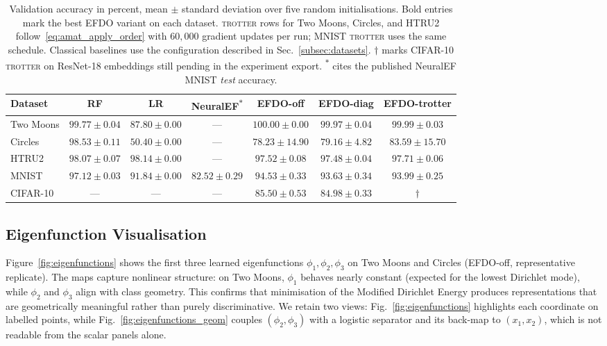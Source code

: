 \documentclass{article}
\theoremstyle{plain}
\theoremstyle{definition}
\theoremstyle{remark}
\newcommand{\new}[1]{#1}
\begin{document}
\begin{table}[t]
  \caption{\new{Validation accuracy in percent, mean $\pm$ standard deviation over five random initialisations. Bold entries mark the best EFDO variant on each dataset. \textsc{trotter} rows for Two Moons, Circles, and HTRU2 follow~\eqref{eq:amat_apply_order} with $60{,}000$ gradient updates per run; MNIST \textsc{trotter} uses the same schedule. Classical baselines use the configuration described in Sec.~\ref{subsec:datasets}. $\dagger$ marks CIFAR-10 \textsc{trotter} on ResNet-18 embeddings still pending in the experiment export. \textsuperscript{$\ast$} cites the published NeuralEF MNIST \emph{test} accuracy.}}
  \label{tab:main_results}
  \centering
  \small
  \begin{tabular}{lcccccc}
    \toprule
    \textbf{Dataset} & \textbf{RF} & \textbf{LR} & \new{\textbf{NeuralEF}\textsuperscript{$\ast$}} & \new{\textbf{EFDO-off}} & \new{\textbf{EFDO-diag}} & \new{\textbf{EFDO-trotter}} \\
    \midrule
    \new{Two Moons}  & \new{$99.77{\pm}0.04$} & \new{$87.80{\pm}0.00$} & \new{---}  & \new{$\mathbf{100.00}{\pm}0.00$} & \new{$99.97{\pm}0.04$} & \new{$99.99{\pm}0.03$} \\
    \new{Circles}    & \new{$98.53{\pm}0.11$} & \new{$50.40{\pm}0.00$} & \new{---}  & \new{$78.23{\pm}14.90$}          & \new{$79.16{\pm}4.82$} & \new{$\mathbf{83.59}{\pm}15.70$} \\
    \new{HTRU2}      & \new{$98.07{\pm}0.07$} & \new{$98.14{\pm}0.00$} & \new{---}  & \new{$97.52{\pm}0.08$}           & \new{$97.48{\pm}0.04$} & \new{$\mathbf{97.71}{\pm}0.06$} \\
    \midrule
    \new{MNIST}      & \new{$97.12{\pm}0.03$} & \new{$91.84{\pm}0.00$} & \new{$82.52{\pm}0.29$} & \new{$\mathbf{94.53}{\pm}0.33$}  & \new{$93.63{\pm}0.34$} & \new{$93.99{\pm}0.25$} \\
    \new{CIFAR-10}   & \new{---}  & \new{---} & \new{---} & \new{$\mathbf{85.50}{\pm}0.53$}  & \new{$84.98{\pm}0.33$} & \new{$\dagger$} \\
    \bottomrule
  \end{tabular}
\end{table}


\subsection{Eigenfunction Visualisation}

Figure~\ref{fig:eigenfunctions} shows the first three learned eigenfunctions $\phi_1, \phi_2, \phi_3$
on Two Moons and Circles (EFDO-off, representative replicate).
The maps capture nonlinear structure: on Two Moons, $\phi_1$ behaves nearly constant (expected for the lowest Dirichlet mode), while $\phi_2$ and $\phi_3$ align with class geometry.
This confirms that minimisation of the Modified Dirichlet Energy produces representations that are geometrically meaningful rather than purely discriminative.
We retain two views: Fig.~\ref{fig:eigenfunctions} highlights each coordinate on labelled points, while Fig.~\ref{fig:eigenfunctions_geom} couples $(\phi_2,\phi_3)$ with a logistic separator and its back-map to $(x_1,x_2)$, which is not readable from the scalar panels alone.
\end{document}
